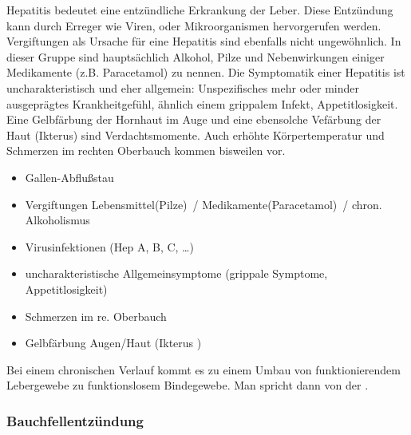 \gMarried
{%
Hepatitis bedeutet eine
entzündliche Erkrankung der Leber. Diese Entzündung kann durch Erreger wie Viren, oder Mikroorganismen hervorgerufen werden.
Vergiftungen als Ursache für eine Hepatitis sind ebenfalls nicht ungewöhnlich. In
dieser Gruppe sind hauptsächlich Alkohol, Pilze und Nebenwirkungen einiger
Medikamente (z.B. Paracetamol) zu nennen. Die Symptomatik einer Hepatitis ist
uncharakteristisch und eher allgemein: Unspezifisches mehr oder minder
ausgeprägtes Krankheitgefühl, ähnlich einem grippalem Infekt, Appetitlosigkeit.
Eine Gelbfärbung der Hornhaut im Auge und eine ebensolche Vefärbung der Haut
(Ikterus) sind Verdachtsmomente. Auch erhöhte Körpertemperatur und Schmerzen im
rechten Oberbauch kommen bisweilen vor.
}
{

\begin{itemize}
    \item Gallen-Abflußstau
    \item Vergiftungen Lebensmittel(Pilze)~/
    Medikamente(Paracetamol)~/ chron. Alkoholismus
    \item Virusinfektionen (Hep A, B, C, \ldots )
\end{itemize}


\begin{itemize}
    \item uncharakteristische Allgemeinsymptome (grippale Symptome,
Appetitlosigkeit)
\item Schmerzen im re. Oberbauch
\item Gelbfärbung Augen/Haut (Ikterus )
\end{itemize}}


Bei einem chronischen
Verlauf kommt es zu einem Umbau von
funktionierendem Lebergewebe zu
funktionslosem Bindegewebe. Man spricht
dann von der
\label{topic:leberzirrhose}.




\subsubsection{Bauchfellentzündung}



